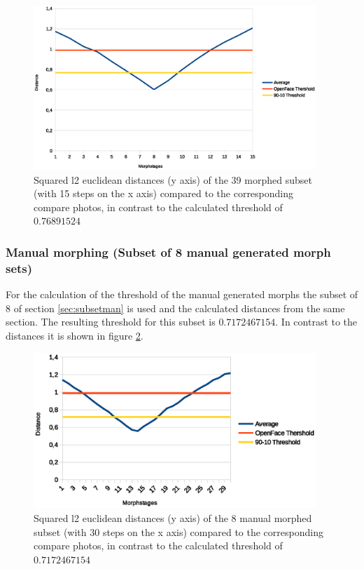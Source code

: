 \begin{figure}[htbp] 
	\centering
		\includegraphics[width=0.95\textwidth]{Resources/result39-90-10ODF.eps}
	\caption{Squared l2 euclidean distances (y axis) of the 39 morphed subset (with 15 steps on the x axis) compared to the corresponding compare photos, in contrast to the calculated threshold of $0.76891524$} %
	\label{fig:Result39-90-10}
\end{figure}

\subsubsection{Manual morphing (Subset of 8 manual generated morph sets)}\label{sec:manmorph-thres}
For the calculation of the threshold of the manual generated morphs the subset of 8 of section \ref{sec:subsetman} is used and the calculated distances from the same section.
The resulting threshold for this subset is \textbf{$0.7172467154$}. In contrast to the distances it is shown in figure \ref{fig:Resultman-90-10}.


\begin{figure}[htbp] 
	\centering
		\includegraphics[width=0.95\textwidth]{Resources/result-jannis-mean-90-10ODF.eps}
	\caption{Squared l2 euclidean distances (y axis) of the 8 manual morphed subset (with 30 steps on the x axis) compared to the corresponding compare photos, in contrast to the calculated threshold of $0.7172467154$} %
	\label{fig:Resultman-90-10}
\end{figure}

